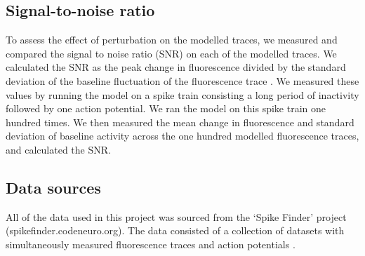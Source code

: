 \subsection{Signal-to-noise ratio}\label{sec:snr}
To assess the effect of perturbation on the modelled traces, we measured and compared the signal to noise ratio (SNR) on each of the modelled traces. We calculated the SNR as the peak change in fluorescence divided by the standard deviation of the baseline fluctuation of the fluorescence trace  \parencite{tada}. We measured these values by running the model on a spike train consisting a long period of inactivity followed by one action potential. We ran the model on this spike train one hundred times. We then measured the mean change in fluorescence and standard deviation of baseline activity across the one hundred modelled fluorescence traces, and calculated the SNR.

\subsection{Data sources}
All of the data used in this project was sourced from the ‘Spike Finder’ project (spikefinder.codeneuro.org). The data consisted of a collection of datasets with simultaneously measured fluorescence traces and action potentials  \parencite{berens}.
